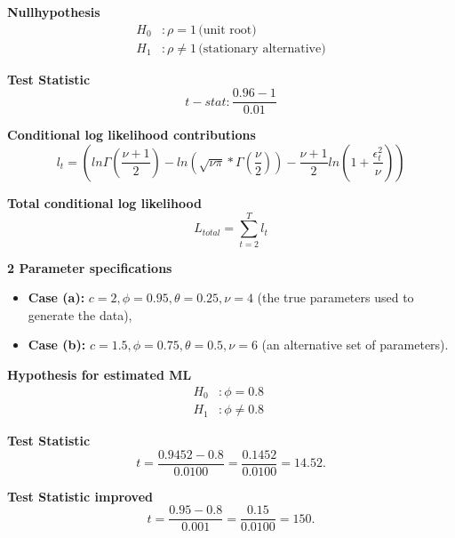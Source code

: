 \documentclass[12pt]{article}
\begin{document}
\textbf{Nullhypothesis}
\begin{equation}
\begin{aligned}
    H_0 &: \rho = 1 \, \text{(unit root)} \\
    H_1 &: \rho \neq 1 \, \text{(stationary alternative)}
\end{aligned}
\label{eq:dftest}
\end{equation}

\textbf{Test Statistic}
\begin{equation}
    t-stat: \frac{0.96-1}{0.01}
    \label{eq:dftstat2}
\end{equation}

\textbf{Conditional log likelihood contributions}
 \begin{equation}
      l_{t} =  (ln \Gamma(\frac{\nu +1}{2})- ln(\sqrt{\nu \pi} * \Gamma(\frac{\nu}{2})) - \frac{\nu+1}{2}ln(1+\frac{\epsilon_t^{2}}{\nu}))
      \label{eq:clc}
 \end{equation}

\textbf{Total conditional log likelihood}
\begin{equation}
    L_{total} = \sum_{t=2}^{T} l_t
    \label{eq:tcl}
\end{equation}

\textbf{2 Parameter specifications}
\begin{itemize}
    \item \textbf{Case (a):} $c = 2, \phi = 0.95, \theta = 0.25, \nu = 4$ (the true parameters used to generate the data),
    \item \textbf{Case (b):} $c = 1.5, \phi = 0.75, \theta = 0.5, \nu = 6$ (an alternative set of parameters).
    \label{specifica}
\end{itemize}

\textbf{Hypothesis for estimated ML}
\begin{equation}
\begin{aligned}
    H_0 &: \phi = 0.8 \, \ \\
    H_1 &: \phi \neq 0.8 \,
\end{aligned}
\label{eq:nullacht}
\end{equation}

\textbf{Test Statistic}
\begin{equation}
t = \frac{0.9452 - 0.8}{0.0100} = \frac{0.1452}{0.0100} = 14.52.
    \label{eq:tstatmlone}
\end{equation}

\textbf{Test Statistic improved}
\begin{equation}
t = \frac{0.95 - 0.8}{0.001} = \frac{0.15}{0.0100} = 150.
    \label{eq:tstatmltwo}
\end{equation}
\end{document}
